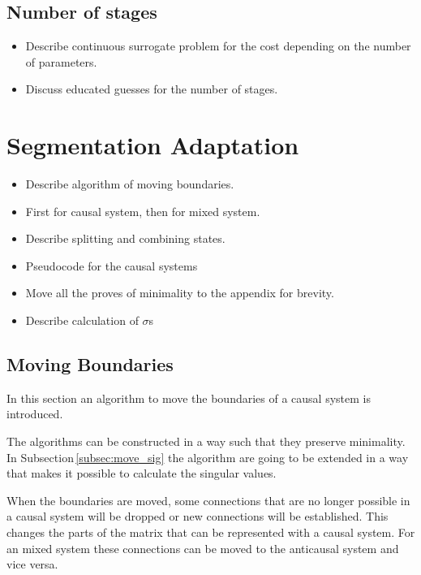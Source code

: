 \documentclass[doctype=mastersthesis,BCOR=15mm,biblatex]{ldvbook}%
\begin{document}
\subsection{Number of stages}
\begin{itemize}
\item Describe continuous surrogate problem for the cost depending on the number of parameters. 
\item Discuss educated guesses for the number of stages.
\end{itemize}

\section{Segmentation Adaptation}
\begin{itemize}
\item Describe algorithm of moving boundaries.
\item First for causal system, then for mixed system.

\item Describe splitting and combining states.

\item Pseudocode for the causal systems

\item Move all the proves of minimality to the appendix for brevity.
\item Describe calculation of $\sigma$s
\end{itemize}
\subsection{Moving Boundaries}
In this section an algorithm to move the boundaries of a causal system is introduced.

The algorithms can be constructed in a way such that they preserve minimality.
In Subsection\,\ref{subsec:move_sig} the algorithm are going to be extended in a way that makes it possible to calculate the singular values.

When the boundaries are moved, some connections that are no longer possible in a causal system will be dropped or new connections will be established.
This changes the parts of the matrix that can be represented with a causal system.
For an mixed system these connections can be moved to the anticausal system and vice versa.
\end{document}
